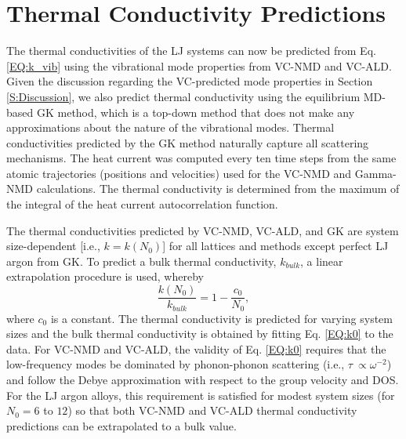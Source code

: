 \documentclass[12pt,twocolumn,iop]{/usr/share/texmf-texlive/tex/latex/iop/iopart}[/usr/share/texmf-texlive/tex/latex/iop/]
\begin{document}

\section{\label{S:Thermal Conductivity}Thermal Conductivity Predictions}

The thermal conductivities of the LJ systems can now be predicted from 
Eq. \eqref{EQ:k_vib} using the vibrational mode properties 
from VC-NMD and VC-ALD. Given the discussion regarding the 
VC-predicted mode properties in Section \ref{S:Discussion}, 
we also predict thermal conductivity using the equilibrium 
MD-based GK method, which is a top-down method that does not make any 
approximations about the nature of the vibrational modes. 
Thermal conductivities predicted by the GK method 
naturally capture all scattering mechanisms.
\cite{landry_complex_2008,he_thermal_2011,he_lattice_2012} 
The heat current was computed every ten time steps from the same atomic 
trajectories (positions and velocities) used for the VC-NMD and 
Gamma-NMD calculations.  The thermal conductivity is 
determined from the maximum of the integral of the heat 
current autocorrelation function.

The thermal conductivities predicted by VC-NMD, VC-ALD, and GK are system 
size-dependent [i.e., $k = k(N_0)$] for all lattices and methods except 
perfect LJ argon from GK.\cite{mcgaughey_quantitative_2004} 
To predict a bulk thermal conductivity, $k_{bulk}$,  
a linear extrapolation procedure is 
used, whereby 
\begin{equation}\label{EQ:k0}
\frac{k(N_0)}{k_{bulk}} = 1 - \frac{c_0}{N_0},
\end{equation}
where $c_0$ is a constant.\cite{turney_predicting_2009,esfarjani_heat_2011,
shiomi_thermal_2011} The thermal conductivity 
is predicted for varying system sizes and the bulk thermal conductivity is 
obtained by fitting Eq. \eqref{EQ:k0} to the data. 
For VC-NMD and VC-ALD, the validity of Eq. \eqref{EQ:k0}  
requires that the low-frequency modes be dominated by 
phonon-phonon scattering (i.e., $\tau\ \propto \omega^{-2}$) and  
follow the Debye approximation 
with respect to the group velocity and DOS.
\cite{shiomi_thermal_2011,esfarjani_heat_2011} For the LJ 
argon alloys, this requirement is satisfied for modest system sizes 
(for $N_0 = 6$ to $12$) so that both VC-NMD and VC-ALD thermal 
conductivity predictions can be extrapolated to a bulk value. 
\end{document}
